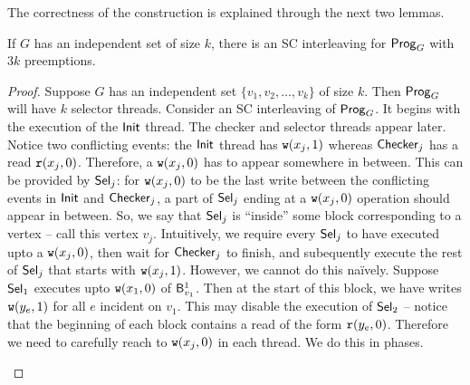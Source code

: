
The correctness of the construction is explained through the next two lemmas.

\begin{lemma}\label{lem:independent-set-to-SC-interleaving}
If $G$ has an independent set of size $k$, there is an SC interleaving for $\mathsf{Prog}_G$ with $3k$ preemptions.
\end{lemma}
\begin{proof} 
Suppose $G$ has an independent set $\{v_1, v_2, \dots, v_k\}$ of size $k$. Then $\mathsf{Prog}_G$ will have $k$ selector threads. 
Consider an SC interleaving of $\mathsf{Prog}_G$. It begins with the execution of the $\mathsf{Init}$ thread. The checker and selector threads appear later. 
Notice two conflicting events: the $\mathsf{Init}$ thread has $\mathtt{w}(x_j, 1)$ whereas $\mathsf{Checker}_j$ has a read $\mathtt{r}(x_j, 0)$. Therefore, a $\mathtt{w}(x_j, 0)$ has to appear somewhere in between. This can be provided by $\mathsf{Sel}_j$: for $\mathtt{w}(x_j, 0)$ to be the last write between the conflicting events in $\mathsf{Init}$ and $\mathsf{Checker}_j$, a part of $\mathsf{Sel}_j$ ending at a $\mathtt{w}(x_j,0)$ operation should appear in between. So, we say that $\mathsf{Sel}_j$ is ``inside'' some block corresponding to a vertex -- call this vertex $v_j$. Intuitively, we require every $\mathsf{Sel}_j$ to have executed upto a $\mathtt{w}(x_j, 0)$, then wait for $\mathsf{Checker}_j$ to finish, and subequently execute the rest of $\mathsf{Sel}_j$ that starts with $\mathtt{w}(x_j, 1)$. However, we cannot do this na\"ively. Suppose $\mathsf{Sel}_1$ executes upto $\mathtt{w}(x_1,0)$ of $\mathsf{B}^1_{v_1}$. Then at the start of this block, we have writes $\mathtt{w}(y_e, 1)$ for all $e$ incident on $v_1$. This may disable the execution of $\mathsf{Sel}_2$ -- notice that the beginning of each block contains a read of the form $\mathtt{r}(y_e, 0)$. Therefore we need to carefully reach to $\mathtt{w}(x_j, 0)$ in each thread. We do this in phases. 

\begin{figure}[h]
\centering
{}
\end{figure}
\end{proof}
